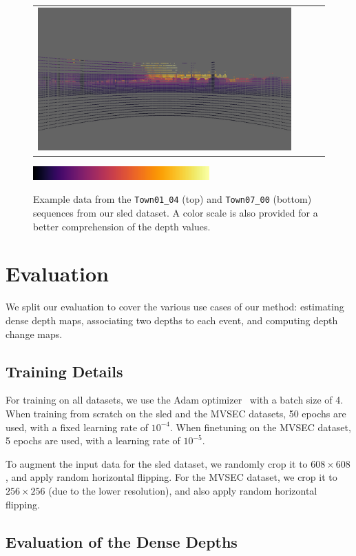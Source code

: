 \begin{figure}
\begin{tabular}{@{}cccc@{}}
    \includegraphics[width=0.245\linewidth]{mainmatter/figures/4_depth_conv/sled_content/Town07_00_lidar_lightgray_fixed.png}
  \end{tabular}
  \includegraphics[width=0.35\linewidth]{mainmatter/figures/4_depth_conv/sled_content/scale.png} \\
  \cprotect\caption{Example data from the \verb|Town01_04| (top) and \verb|Town07_00| (bottom) sequences from our \acrshort{sled} dataset. A color scale is also provided for a better comprehension of the depth values.}\label{fig:aled:sled_content}
\end{figure}


\section{Evaluation}\label{sec:aled:eval}
We split our evaluation to cover the various use cases of our method: estimating dense depth maps, associating two depths to each event, and computing depth change maps.

\subsection{Training Details}
For training on all datasets, we use the Adam optimizer~\cite{Kingma2015AdamAM} with a batch size of 4. When training from scratch on the \acrshort{sled} and the MVSEC datasets, 50 epochs are used, with a fixed learning rate of \(10^{-4}\). When finetuning on the MVSEC dataset, 5 epochs are used, with a learning rate of \(10^{-5}\).

To augment the input data for the \acrshort{sled} dataset, we randomly crop it to \(608 \times 608\), and apply random horizontal flipping. For the MVSEC dataset, we crop it to \(256 \times 256\) (due to the lower resolution), and also apply random horizontal flipping.

\subsection{Evaluation of the Dense Depths}

